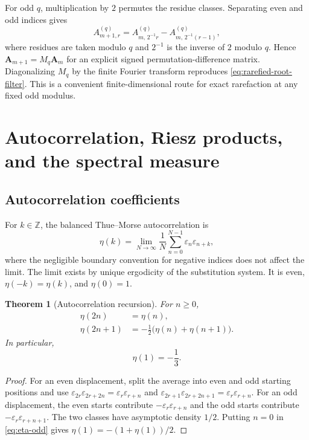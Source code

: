 \documentclass[11pt,oneside]{article}
\newtheorem{theorem}{Theorem}[section]
\theoremstyle{definition}
\theoremstyle{remark}
\newcommand{\Z}{\mathbb Z}
\newcommand{\eps}{\varepsilon}
\begin{document}
For odd $q$, multiplication by $2$ permutes the residue classes.  Separating
even and odd indices gives
\begin{equation}\label{eq:rarefied-matrix-recursion}
 A_{m+1,r}^{(q)}
 =A_{m,\,2^{-1}r}^{(q)}
  -A_{m,\,2^{-1}(r-1)}^{(q)},
\end{equation}
where residues are taken modulo $q$ and $2^{-1}$ is the inverse of $2$ modulo
$q$.  Hence $\mathbf A_{m+1}=M_q\mathbf A_m$ for an explicit signed
permutation-difference matrix.  Diagonalizing $M_q$ by the finite Fourier
transform reproduces \cref{eq:rarefied-root-filter}.  This is a convenient
finite-dimensional route for exact rarefaction at any fixed odd modulus.

\section{Autocorrelation, Riesz products, and the spectral measure}

\subsection{Autocorrelation coefficients}

For $k\in\Z$, the balanced Thue--Morse autocorrelation is
\begin{equation}\label{eq:autocorrelation-def}
 \eta(k)=\lim_{N\to\infty}\frac1N
 \sum_{n=0}^{N-1}\eps_n\eps_{n+k},
\end{equation}
where the negligible boundary convention for negative indices does not affect
the limit.  The limit exists by unique ergodicity of the substitution system.
It is even, $\eta(-k)=\eta(k)$, and $\eta(0)=1$.

\begin{theorem}[Autocorrelation recursion]\label{thm:autocorrelation-recursion}
For $n\ge0$,
\begin{align}
 \eta(2n)&=\eta(n),\label{eq:eta-even}\\
 \eta(2n+1)&=-\frac12\bigl(\eta(n)+\eta(n+1)\bigr).
 \label{eq:eta-odd}
\end{align}
In particular,
\begin{equation}\label{eq:eta-one}
 \eta(1)=-\frac13.
\end{equation}
\end{theorem}

\begin{proof}
For an even displacement, split the average into even and odd starting
positions and use
$\eps_{2r}\eps_{2r+2n}=\eps_r\eps_{r+n}$ and
$\eps_{2r+1}\eps_{2r+2n+1}=\eps_r\eps_{r+n}$.  For an odd displacement, the
even starts contribute $-\eps_r\eps_{r+n}$ and the odd starts contribute
$-\eps_r\eps_{r+n+1}$.  The two classes have asymptotic density $1/2$.
Putting $n=0$ in \cref{eq:eta-odd} gives
$\eta(1)=-(1+\eta(1))/2$.
\end{proof}
\end{document}
